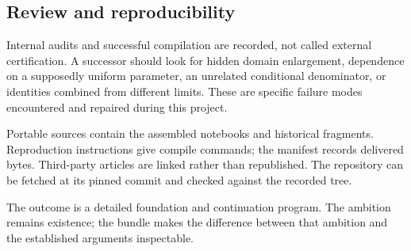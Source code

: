 \subsection{Review and reproducibility}

Internal audits and successful compilation
are recorded, not called external
certification. A successor should look for
hidden domain enlargement, dependence on a
supposedly uniform parameter, an unrelated
conditional denominator, or identities
combined from different limits. These are
specific failure modes encountered and
repaired during this project.

Portable sources contain the assembled
notebooks and historical fragments.
Reproduction instructions give compile
commands; the manifest records delivered
bytes. Third-party articles are linked
rather than republished. The repository
can be fetched at its pinned commit and
checked against the recorded tree.

The outcome is a detailed foundation and
continuation program. The ambition remains
existence; the bundle makes the difference
between that ambition and the established
arguments inspectable.
